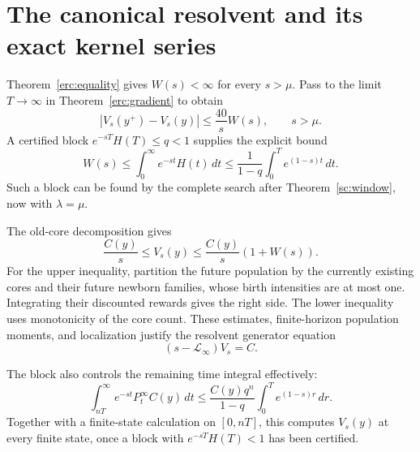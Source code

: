 \section{The canonical resolvent and its exact kernel series}
\label{canonical:section}

Theorem~\ref{erc:equality} gives $W(s)<\infty$ for every $s>\mu$.
Pass to the limit $T\to\infty$ in Theorem~\ref{erc:gradient} to obtain
\begin{equation}\label{erc:infinite-gradient}
 |V_s(y^+)-V_s(y)|\le\frac{40}{s}W(s),\qquad s>\mu.
\end{equation}
A certified block $e^{-sT}H(T)\le q<1$ supplies the explicit bound
\begin{equation}\label{canonical:W-bound}
 W(s)\le\int_0^\infty e^{-st}H(t)\,dt
 \le\frac1{1-q}\int_0^T e^{(1-s)t}\,dt.
\end{equation}
Such a block can be found by the complete search after
Theorem~\ref{sc:window}, now with $\lambda=\mu$.

The old-core decomposition gives
\begin{equation}\label{canonical:linear}
 \frac{C(y)}s\le V_s(y)
 \le\frac{C(y)}s(1+W(s)).
\end{equation}
For the upper inequality, partition the future population by the
currently existing cores and their future newborn families, whose
birth intensities are at most one. Integrating their discounted
rewards gives the right side. The lower inequality uses monotonicity
of the core count. These estimates, finite-horizon population moments,
and localization justify the resolvent generator equation
\begin{equation}\label{canonical:generator}
 (s-\mathcal L_\infty)V_s=C.
\end{equation}

The block also controls the remaining time integral effectively:
\begin{equation}\label{canonical:time-tail}
 \int_{nT}^\infty e^{-st}P_t^\infty C(y)\,dt
 \le\frac{C(y)q^n}{1-q}\int_0^T e^{(1-s)r}\,dr.
\end{equation}
Together with a finite-state calculation on $[0,nT]$, this computes
$V_s(y)$ at every finite state, once a block with $e^{-sT}H(T)<1$ has been certified.

